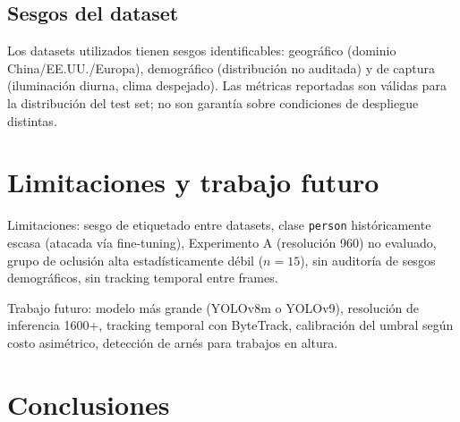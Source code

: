 \documentclass[conference]{IEEEtran}
\begin{document}
\subsection{Sesgos del dataset}

Los datasets utilizados tienen sesgos identificables: geográfico
(dominio China/EE.UU./Europa), demográfico (distribución no
auditada) y de captura (iluminación diurna, clima despejado). Las
métricas reportadas son válidas para la distribución del test set;
no son garantía sobre condiciones de despliegue distintas.

\section{Limitaciones y trabajo futuro}

Limitaciones: sesgo de etiquetado entre datasets, clase
\texttt{person} históricamente escasa (atacada vía fine-tuning),
Experimento A (resolución 960) no evaluado, grupo de oclusión
alta estadísticamente débil ($n=15$), sin auditoría de sesgos
demográficos, sin tracking temporal entre frames.

Trabajo futuro: modelo más grande (YOLOv8m o YOLOv9), resolución
de inferencia 1600+, tracking temporal con ByteTrack, calibración
del umbral según costo asimétrico, detección de arnés para trabajos
en altura.

\section{Conclusiones}
\end{document}
